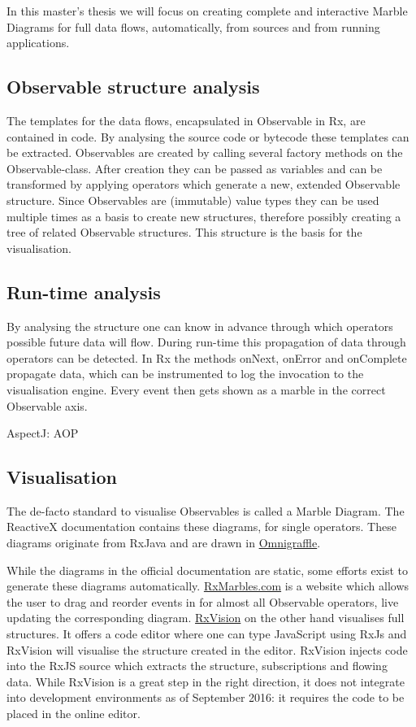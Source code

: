 \documentclass[11pt,a4paper]{article}
\begin{document}
In this master's thesis we will focus on creating complete and interactive Marble Diagrams for full data flows, automatically, from sources and from running applications.

\subsection{Observable structure analysis}
The templates for the data flows, encapsulated in Observable in Rx, are contained in code. By analysing the source code or bytecode these templates can be extracted. Observables are created by calling several factory methods on the Observable-class. After creation they can be passed as variables and can be transformed by applying operators which generate a new, extended Observable structure. Since Observables are (immutable) value types they can be used multiple times as a basis to create new structures, therefore possibly creating a tree of related Observable structures. This structure is the basis for the visualisation.

\subsection{Run-time analysis}
By analysing the structure one can know in advance through which operators possible future data will flow. During run-time this propagation of data through operators can be detected. In Rx the methods onNext, onError and onComplete propagate data, which can be instrumented to log the invocation to the visualisation engine. Every event then gets shown as a marble in the correct Observable axis.

AspectJ: AOP

\subsection{Visualisation}
The de-facto standard to visualise Observables is called a Marble Diagram. The ReactiveX documentation contains these diagrams, for single operators. These diagrams originate from RxJava and are drawn in \href{https://www.omnigroup.com/omnigraffle}{Omnigraffle}.

While the diagrams in the official documentation are static, some efforts exist to generate these diagrams automatically. \href{http://RxMarbles.com}{RxMarbles.com} is a website which allows the user to drag and reorder events in for almost all Observable operators, live updating the corresponding diagram.
\href{https://github.com/jaredly/rxvision}{RxVision} on the other hand visualises full structures. It offers a code editor where one can type JavaScript using RxJs and RxVision will visualise the structure created in the editor. RxVision injects code into the RxJS source which extracts the structure, subscriptions and flowing data. While RxVision is a great step in the right direction, it does not integrate into development environments as of September 2016: it requires the code to be placed in the online editor.
\end{document}
